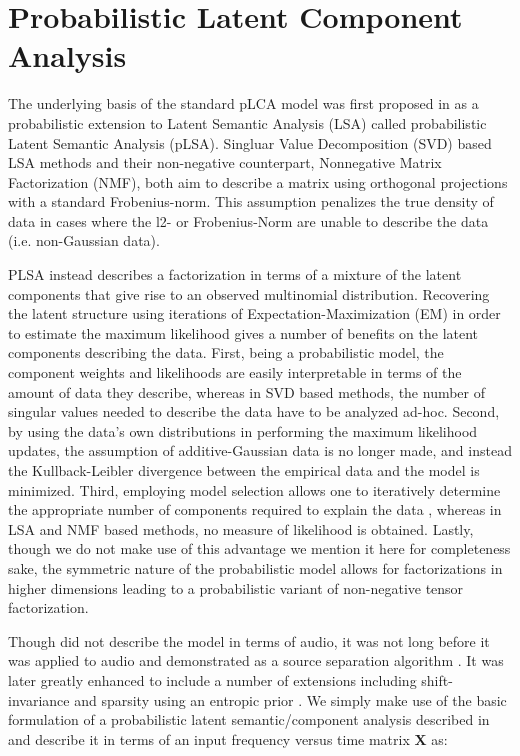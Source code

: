 \section{Probabilistic Latent Component Analysis}
\label{sec:plca}

The underlying basis of the standard pLCA model was first proposed in \cite{Hofmann1999} as a probabilistic extension to Latent Semantic Analysis (LSA) called probabilistic Latent Semantic Analysis (pLSA).  Singluar Value Decomposition (SVD) based LSA methods and their non-negative counterpart, Nonnegative Matrix Factorization (NMF), both aim to describe a matrix using orthogonal projections with a standard Frobenius-norm.  This assumption penalizes the true density of data in cases where the l2- or Frobenius-Norm are unable to describe the data (i.e. non-Gaussian data).  

PLSA instead describes a factorization in terms of a mixture of the latent components that give rise to an observed multinomial distribution.  Recovering the latent structure using iterations of Expectation-Maximization (EM) in order to estimate the maximum likelihood gives a number of benefits on the latent components describing the data.  First, being a probabilistic model, the component weights and likelihoods are easily interpretable in terms of the amount of data they describe, whereas in SVD based methods, the number of singular values needed to describe the data have to be analyzed ad-hoc.  Second, by using the data's own distributions in performing the maximum likelihood updates, the assumption of additive-Gaussian data is no longer made, and instead the Kullback-Leibler divergence between the empirical data and the model is minimized.  Third, employing model selection allows one to iteratively determine the appropriate number of components required to explain the data \cite{Mital2012b}, whereas in LSA and NMF based methods, no measure of likelihood is obtained.  Lastly, though we do not make use of this advantage we mention it here for completeness sake, the symmetric nature of the probabilistic model allows for factorizations in higher dimensions leading to a probabilistic variant of non-negative tensor factorization.

Though \cite{Hofmann1999,Hofmann2001} did not describe the model in terms of audio, it was not long before it was applied to audio and demonstrated as a source separation algorithm \cite{SmaragdisRajShashanka}.  It was later greatly enhanced to include a number of extensions including shift-invariance and sparsity using an entropic prior \cite{Smaragdis2007}.  We simply make use of the basic formulation of a probabilistic latent semantic/component analysis described in \cite{Hofmann1999,SmaragdisRajShashanka} and describe it in terms of an input frequency versus time matrix $\mathbf{X}$ as:

